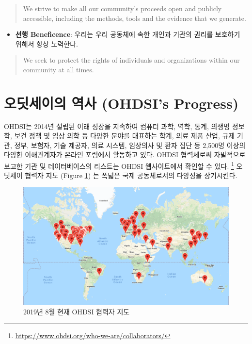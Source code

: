 \documentclass[11pt]{book}
\providecommand{\tightlist}{%
  \setlength{\itemsep}{0pt}\setlength{\parskip}{0pt}}
\let\rmarkdownfootnote\footnote%
\def\footnote{\protect\rmarkdownfootnote}
\theoremstyle{definition}
\theoremstyle{definition}
\theoremstyle{definition}
\theoremstyle{remark}
\begin{document}
\begin{quote}
We strive to make all our community's proceeds open and publicly
accessible, including the methods, tools and the evidence that we
generate.
\end{quote}

\begin{itemize}
\tightlist
\item
  \textbf{선행 Beneficence}: 우리는 우리 공동체에 속한 개인과 기관의
  권리를 보호하기 위해서 항상 노력한다.
\end{itemize}

\begin{quote}
We seek to protect the rights of individuals and organizations within
our community at all times.
\end{quote}


\section{오딧세이의 역사 (OHDSI's Progress)}\label{--ohdsis-progress}

OHDSI는 2014년 설립된 이래 성장을 지속하여 컴퓨터 과학, 역학, 통계,
의생명 정보학, 보건 정책 및 임상 의학 등 다양한 분야를 대표하는 학계,
의료 제품 산업, 규제 기관, 정부, 보험자, 기술 제공자, 의료 시스템,
임상의사 및 환자 집단 등 2,500명 이상의 다양한 이해관계자가 온라인
포럼에서 활동하고 있다. OHDSI 협력체로써 자발적으로 보고한 기관 및
데이터베이스의 리스트는 OHDSI 웹사이트에서 확인할 수 있다. \footnote{\url{https://www.ohdsi.org/who-we-are/collaborators/}}
오딧세이 협력자 지도 (Figure \ref{fig:collaboratormap}) 는 폭넓은 국제
공동체로서의 다양성을 상기시킨다.

\begin{figure}

{\centering \includegraphics[width=1\linewidth]{images/OhdsiCommunity/mapOfCollaborators} 

}

\caption{2019년 8월 현재 OHDSI 협력자 지도}\label{fig:collaboratormap}
\end{figure}
\end{document}
